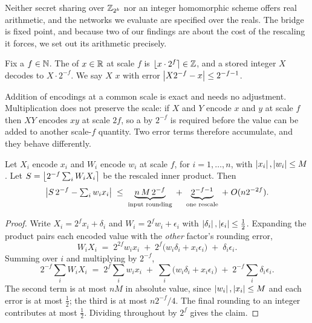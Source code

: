 Neither secret sharing over $\mathbb{Z}_{2^k}$ nor an integer homomorphic scheme offers
real arithmetic, and the networks we evaluate are specified over the reals. The
bridge is fixed point, and because two of our findings are about the cost of the
rescaling it forces, we set out its arithmetic precisely.

\begin{definition}
\label{def:fixed}
Fix a  $f \in \mathbb{N}$. The  of $x \in \mathbb{R}$ at
scale $f$ is $\lfloor x \cdot 2^{f} \rceil \in \mathbb{Z}$, and a stored integer $X$
decodes to $X \cdot 2^{-f}$. We say $X$  $x$ with error
$\left\lvert X 2^{-f} - x \right\rvert \le 2^{-f-1}$.
\end{definition}

Addition of encodings at a common scale is exact and needs no adjustment.
Multiplication does not preserve the scale: if $X$ and $Y$ encode $x$ and $y$ at
scale $f$ then $XY$ encodes $xy$ at scale $2f$, so a  by $2^{-f}$ is
required before the value can be added to another scale-$f$ quantity. Two error
terms therefore accumulate, and they behave differently.

\begin{proposition}
\label{prop:fixed-error}
Let $X_i$ encode $x_i$ and $W_i$ encode $w_i$ at scale $f$, for
$i = 1,\dots,n$, with $\left\lvert x_i \right\rvert,\left\lvert w_i \right\rvert \le M$. Let
$S = \left\lfloor 2^{-f}\sum_i W_i X_i \right\rceil$ be the rescaled inner product. Then
\[
  \left\lvert S\,2^{-f} - \textstyle\sum_i w_i x_i \right\rvert
  \;\le\; \underbrace{n\,M\,2^{-f}}_{\text{input rounding}}
  \;+\; \underbrace{2^{-f-1}}_{\text{one rescale}}
  \;+\; O(n 2^{-2f}).
\]
\end{proposition}

\begin{proof}
Write $X_i = 2^f x_i + \delta_i$ and $W_i = 2^f w_i + \epsilon_i$ with
$\left\lvert \delta_i \right\rvert,\left\lvert \epsilon_i \right\rvert \le \tfrac12$. Expanding the product pairs each
encoded value with the \emph{other} factor's rounding error,
\[
  W_i X_i \;=\; 2^{2f} w_i x_i \;+\; 2^{f}\bigl(w_i \delta_i + x_i \epsilon_i\bigr)
  \;+\; \delta_i \epsilon_i .
\]
Summing over $i$ and multiplying by $2^{-f}$,
\[
  2^{-f}\sum_i W_iX_i \;=\; 2^{f}\sum_i w_ix_i
  \;+\; \sum_i \bigl(w_i\delta_i + x_i\epsilon_i\bigr)
  \;+\; 2^{-f}\sum_i \delta_i\epsilon_i .
\]
The second term is at most $n M$ in absolute value, since
$\left\lvert w_i \right\rvert,\left\lvert x_i \right\rvert \le M$ and each error is at most $\tfrac12$; the third is at
most $n2^{-f}/4$. The final rounding to an integer contributes at most
$\tfrac12$. Dividing throughout by $2^{f}$ gives the claim.
\end{proof}

